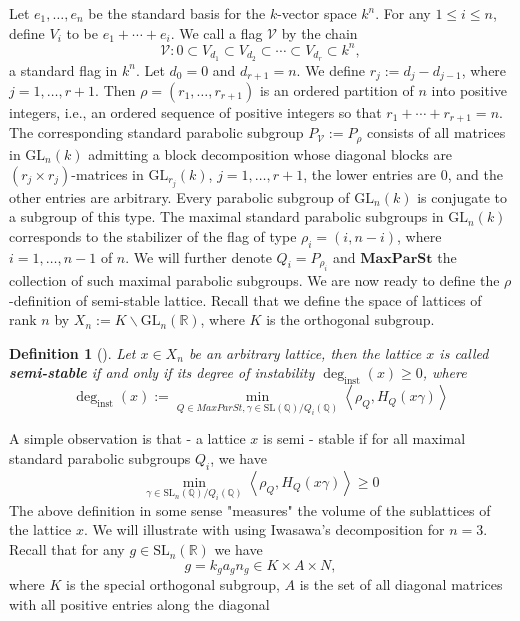 \documentclass[12pt]{article} %
\newtheorem{definition}{Definition}[section]
\begin{document}
Let \( e_1, \ldots, e_n \) be the standard basis for the \( k \)-vector space \( k^n \). For any \( 1 \leq i \leq n \), define \( V_i \) to be \( e_1 + \cdots + e_i \). We call a flag \( \mathcal{V} \) by the chain
\[
    \mathcal{V}: 0 \subset V_{d_1} \subset V_{d_2} \subset \cdots \subset V_{d_r} \subset k^n,
\]
a standard flag in \( k^n \). Let \( d_0 = 0 \) and \( d_{r+1} = n \). We define \( r_j := d_j - d_{j-1} \), where \( j = 1, \ldots, r+1 \). Then \( \rho = (r_1, \ldots, r_{r+1}) \) is an ordered partition of \( n \) into positive integers, i.e., an ordered sequence of positive integers so that \( r_1 + \cdots + r_{r+1} = n \). The corresponding standard parabolic subgroup \( P_{\mathcal{V}} := P_{\rho} \) consists of all matrices in \( \text{GL}_n(k) \) admitting a block decomposition whose diagonal blocks are \( (r_j \times r_j) \)-matrices in \( \text{GL}_{r_j}(k) \), \( j = 1, \ldots, r+1 \), the lower entries are 0, and the other entries are arbitrary. Every parabolic subgroup of \( \text{GL}_n(k) \) is conjugate to a subgroup of this type.
The maximal standard parabolic subgroups in $\text{GL}_n(k)$ corresponds to the
stabilizer of the flag of type $\rho_i =(i,n-i)$, where $i = 1,\ldots,n-1$ of $n$. We will
further denote $Q_i = P_{\rho_i}$ and $\textbf{MaxParSt}$ the collection of such maximal parabolic subgroups.
We are now ready to define the $\rho$-definition of semi-stable lattice. Recall that
we define the space of lattices of rank $n$ by $X_n := K \backslash \text{GL}_n(\mathbb{R})$, where $K$ is the orthogonal subgroup.
\begin{definition}[\label  = $\rho$-definition]\label{ss2}
    Let $x \in X_n$ be an arbitrary lattice, then the lattice $x$ is called \textbf{semi-stable} if and only if its degree of instability $\deg_{\text{inst}}(x)\ge 0$, where
    \[\deg_{\text{inst}}(x):= \min_{Q \in MaxParSt, \gamma \in \text{SL}(\mathbb{Q})/Q_i(\mathbb{Q})}\left\langle \rho_Q, H_Q(x\gamma) \right\rangle\]
\end{definition}
A simple observation is that - a lattice $x$ is semi - stable if for all maximal standard parabolic subgroups
$Q_i$, we have
\[\min_{\gamma \in \text{SL}_n(\mathbb{Q})/Q_i(\mathbb{Q})}\left\langle \rho_Q, H_Q(x\gamma) \right\rangle \ge 0\]
The above definition in some sense "measures" the volume of the sublattices of the lattice $x$.
We will illustrate with using Iwasawa's decomposition for $n=3$. Recall that for any $g \in \text{SL}_n(\mathbb{R})$ we have
\[ g = k_ga_gn_g \in K \times A \times N,\]
where $K$ is the special orthogonal subgroup, $A$ is the set of all diagonal matrices with all positive entries along the diagonal
\end{document}
